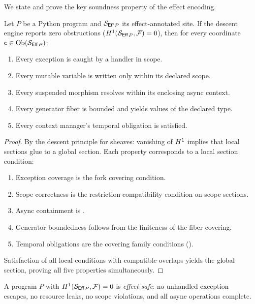 \documentclass[11pt]{article}
\newcommand{\Sect}{\mathcal{F}}          %
\newcommand{\Eff}{\mathsf{Eff}}          %
\newcommand{\EffSite}{{\Site_{\Eff}}}      %
\begin{document}
We state and prove the key soundness property of the effect encoding.

\begin{theorem}\label{thm:soundness}
Let $P$ be a Python program and $\EffSite_P$ its effect-annotated
site.  If the descent engine reports zero obstructions
($\Hcoh{1}(\EffSite_P, \Sect) = 0$), then for every coordinate
$\coord \in \Ob(\EffSite_P)$:
\begin{enumerate}[nosep]
\item Every exception is caught by a handler in scope.
\item Every mutable variable is written only within its declared scope.
\item Every suspended morphism resolves within its enclosing async
  context.
\item Every generator fiber is bounded and yields values of the
  declared type.
\item Every context manager's temporal obligation is satisfied.
\end{enumerate}
\end{theorem}

\begin{proof}
By the descent principle for sheaves: vanishing of $H^{1}$ implies
that local sections glue to a global section.  Each property
corresponds to a local section condition:
\begin{enumerate}[nosep]
\item Exception coverage is the fork covering condition.
\item Scope correctness is the restriction compatibility condition
  on scope sections.
\item Async containment is .
\item Generator boundedness follows from the finiteness of the
  fiber covering.
\item Temporal obligations are the covering family conditions
  ().
\end{enumerate}
Satisfaction of all local conditions with compatible overlaps
yields the global section, proving all five properties simultaneously.
\end{proof}

\begin{corollary}\label{cor:safety}
A program $P$ with $\Hcoh{1}(\EffSite_P, \Sect) = 0$ is
\emph{effect-safe}: no unhandled exception escapes, no resource leaks,
no scope violations, and all async operations complete.
\end{corollary}
\end{document}
